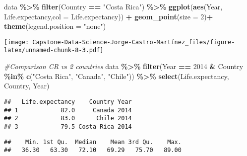 \documentclass[
]{article}
\newenvironment{Shaded}{\begin{snugshade}}{\end{snugshade}}
\newcommand{\AttributeTok}[1]{\textcolor[rgb]{0.13,0.29,0.53}{#1}}
\newcommand{\CommentTok}[1]{\textcolor[rgb]{0.56,0.35,0.01}{\textit{#1}}}
\newcommand{\DecValTok}[1]{\textcolor[rgb]{0.00,0.00,0.81}{#1}}
\newcommand{\FunctionTok}[1]{\textcolor[rgb]{0.13,0.29,0.53}{\textbf{#1}}}
\newcommand{\NormalTok}[1]{#1}
\newcommand{\SpecialCharTok}[1]{\textcolor[rgb]{0.81,0.36,0.00}{\textbf{#1}}}
\newcommand{\StringTok}[1]{\textcolor[rgb]{0.31,0.60,0.02}{#1}}
\begin{document}
\begin{Shaded}
\begin{Highlighting}[]
\NormalTok{data  }\SpecialCharTok{\%\textgreater{}\%}
  \FunctionTok{filter}\NormalTok{(Country }\SpecialCharTok{==} \StringTok{"Costa Rica"}\NormalTok{) }\SpecialCharTok{\%\textgreater{}\%}
  \FunctionTok{ggplot}\NormalTok{(}\FunctionTok{aes}\NormalTok{(Year, Life.expectancy,}\AttributeTok{col =}\NormalTok{ Life.expectancy)) }\SpecialCharTok{+}
  \FunctionTok{geom\_point}\NormalTok{(}\AttributeTok{size =} \DecValTok{2}\NormalTok{)}\SpecialCharTok{+}
  \FunctionTok{theme}\NormalTok{(}\AttributeTok{legend.position =} \StringTok{"none"}\NormalTok{)}
\end{Highlighting}
\end{Shaded}

\texttt{[image: Capstone-Data-Science-Jorge-Castro-Martínez\_files/figure-latex/unnamed-chunk-8-3.pdf]}

\begin{Shaded}
\begin{Highlighting}[]
\CommentTok{\#Comparison CR vs 2 countries}
\NormalTok{data }\SpecialCharTok{\%\textgreater{}\%}
  \FunctionTok{filter}\NormalTok{(Year }\SpecialCharTok{==} \DecValTok{2014} \SpecialCharTok{\&}\NormalTok{ Country }\SpecialCharTok{\%in\%} \FunctionTok{c}\NormalTok{(}\StringTok{"Costa Rica"}\NormalTok{, }\StringTok{"Canada"}\NormalTok{, }\StringTok{"Chile"}\NormalTok{)) }\SpecialCharTok{\%\textgreater{}\%}
  \FunctionTok{select}\NormalTok{(Life.expectancy, Country, Year)}
\end{Highlighting}
\end{Shaded}

\begin{verbatim}
##   Life.expectancy    Country Year
## 1            82.0     Canada 2014
## 2            83.0      Chile 2014
## 3            79.5 Costa Rica 2014
\end{verbatim}

\begin{Shaded}
\end{Shaded}

\begin{verbatim}
##    Min. 1st Qu.  Median    Mean 3rd Qu.    Max. 
##   36.30   63.30   72.10   69.29   75.70   89.00
\end{verbatim}
\end{document}
